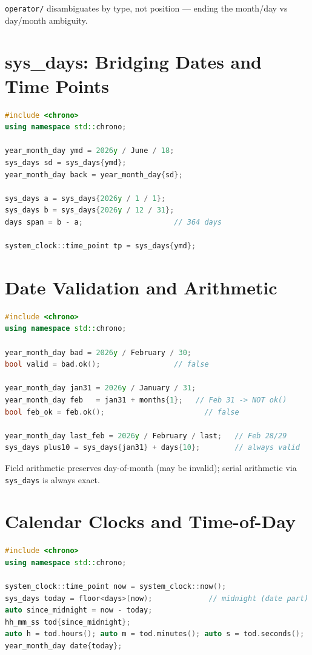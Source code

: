 \texttt{operator/} disambiguates by type, not position --- ending the month/day vs day/month ambiguity.

\section{sys\_days: Bridging Dates and Time Points}
\label{sec:c20-sys-days}

\begin{lstlisting}[language=C++,caption={Converting between field dates and serial time points}]
#include <chrono>
using namespace std::chrono;

year_month_day ymd = 2026y / June / 18;
sys_days sd = sys_days{ymd};
year_month_day back = year_month_day{sd};

sys_days a = sys_days{2026y / 1 / 1};
sys_days b = sys_days{2026y / 12 / 31};
days span = b - a;                     // 364 days

system_clock::time_point tp = sys_days{ymd};
\end{lstlisting}

\section{Date Validation and Arithmetic}
\label{sec:c20-date-arithmetic}

\begin{lstlisting}[language=C++,caption={Validation and calendar arithmetic}]
#include <chrono>
using namespace std::chrono;

year_month_day bad = 2026y / February / 30;
bool valid = bad.ok();                 // false

year_month_day jan31 = 2026y / January / 31;
year_month_day feb   = jan31 + months{1};   // Feb 31 -> NOT ok()
bool feb_ok = feb.ok();                       // false

year_month_day last_feb = 2026y / February / last;   // Feb 28/29
sys_days plus10 = sys_days{jan31} + days{10};        // always valid
\end{lstlisting}

Field arithmetic preserves day-of-month (may be invalid); serial arithmetic via \texttt{sys\_days} is always exact.

\section{Calendar Clocks and Time-of-Day}
\label{sec:c20-time-of-day}

\begin{lstlisting}[language=C++,caption={Extracting time-of-day from a time point}]
#include <chrono>
using namespace std::chrono;

system_clock::time_point now = system_clock::now();
sys_days today = floor<days>(now);             // midnight (date part)
auto since_midnight = now - today;
hh_mm_ss tod{since_midnight};
auto h = tod.hours(); auto m = tod.minutes(); auto s = tod.seconds();
year_month_day date{today};
\end{lstlisting}

